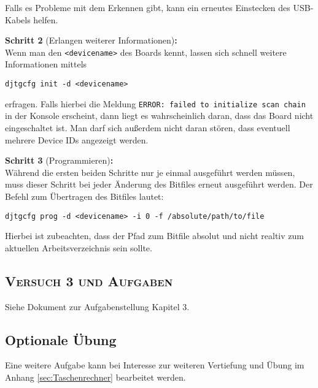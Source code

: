 Falls es Probleme mit dem Erkennen gibt, kann ein erneutes Einstecken des USB-Kabels helfen.

\textbf{Schritt 2} (Erlangen weiterer Informationen)\textbf{:}\\
Wenn man den \texttt{<devicename>} des Boards kennt, lassen sich schnell weitere Informationen mittels
\begin{center}
	\texttt{djtgcfg init -d <devicename>}
\end{center}
erfragen. Falls hierbei die Meldung \texttt{ERROR: failed to initialize scan chain} in der Konsole erscheint, dann liegt es wahrscheinlich daran, dass das Board nicht eingeschaltet ist. Man darf sich außerdem nicht daran stören, dass eventuell mehrere Device IDs angezeigt werden.

\textbf{Schritt 3} (Programmieren)\textbf{:}\\
Während die ersten beiden Schritte nur je einmal ausgeführt werden müssen, muss dieser Schritt bei jeder Änderung des Bitfiles erneut ausgeführt werden. Der Befehl zum Übertragen des Bitfiles lautet:
\begin{center}
	\texttt{djtgcfg prog -d <devicename> -i 0 -f /absolute/path/to/file}
\end{center}
Hierbei ist zubeachten, dass der Pfad zum Bitfile absolut und nicht realtiv zum aktuellen Arbeitsverzeichnis sein sollte.

\subsection{\textsc{Versuch 3 und Aufgaben}}
Siehe Dokument zur Aufgabenstellung Kapitel 3.

\subsection*{Optionale Übung}
Eine weitere Aufgabe kann bei Interesse zur weiteren Vertiefung und Übung im Anhang \ref{sec:Taschenrechner} bearbeitet werden.